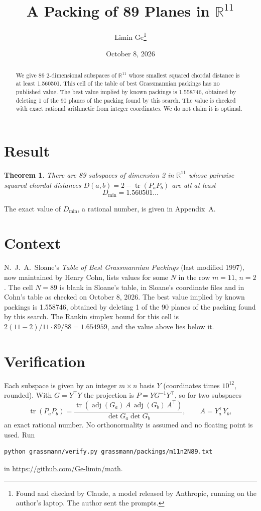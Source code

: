 \documentclass[11pt,a4paper]{article}
\title{A Packing of 89 Planes in $\mathbb{R}^{11}$}
\author{Limin Ge\thanks{Found and checked by Claude, a model released by Anthropic, running on the author's laptop. The author sent the prompts.}}
\date{October 8, 2026}
\newtheorem*{theorem}{Theorem}
\begin{document}
\maketitle
\begin{abstract}
We give 89 2-dimensional subspaces of $\mathbb{R}^{11}$ whose smallest squared chordal distance is at least 1.560501. This cell of the table of best Grassmannian packings has no published value. The best value implied by known packings is 1.558746, obtained by deleting 1 of the 90 planes of the packing found by this search. The value is checked with exact rational arithmetic from integer coordinates. We do not claim it is optimal.
\end{abstract}

\section{Result}
\begin{theorem}
There are 89 subspaces of dimension 2 in $\mathbb{R}^{11}$ whose pairwise squared chordal distances $D(a,b) = 2 - \operatorname{tr}(P_aP_b)$ are all at least
\[ D_{\min} = 1.560501\ldots \]
\end{theorem}
The exact value of $D_{\min}$, a rational number, is given in Appendix~A.


\section{Context}
N.~J.~A.~Sloane's \emph{Table of Best Grassmannian Packings} (last modified 1997), now maintained by Henry Cohn, lists values for some $N$ in the row $m=11$, $n=2$. The cell $N=89$ is blank in Sloane's table, in Sloane's coordinate files and in Cohn's table as checked on October 8, 2026. The best value implied by known packings is 1.558746, obtained by deleting 1 of the 90 planes of the packing found by this search. The Rankin simplex bound for this cell is $2(11-2)/11\cdot 89/88 = 1.654959$, and the value above lies below it.


\section{Verification}
Each subspace is given by an integer $m\times n$ basis $Y$ (coordinates times $10^{12}$, rounded). With $G=Y^\top Y$ the projection is $P=YG^{-1}Y^\top$, so for two subspaces
\[ \operatorname{tr}(P_aP_b)=\frac{\operatorname{tr}(\operatorname{adj}(G_a)\,A\,\operatorname{adj}(G_b)\,A^\top)}{\det G_a\det G_b},\qquad A=Y_a^\top Y_b, \]
an exact rational number. No orthonormality is assumed and no floating point is used. Run
\begin{verbatim}
python grassmann/verify.py grassmann/packings/m11n2N89.txt
\end{verbatim}
in \url{https://github.com/Ge-limin/math}.
\end{document}
